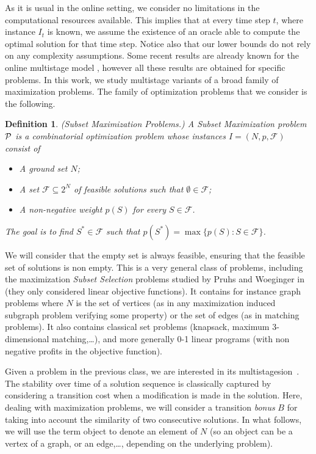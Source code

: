 \documentclass[a4paper]{book}
\newtheorem{definition}{Definition}
\newcommand{\ot}[4]{multistage}
\begin{document}
As it is usual in the online setting, we consider no limitations in the computational resources available. This implies that at every time step $t$, where instance $I_t$ is known, we assume the existence of an oracle able to compute the optimal solution for that time step.  Notice also that our lower bounds do not rely on any complexity assumptions. 
Some recent results are already known for the online multistage model  \cite{Bampis+,Gupta}, however all these results are obtained for specific problems.
In this work, we study multistage variants  of a broad family of maximization problems. The family of optimization problems that we consider is the following. 


 
 

\begin{definition}

\emph{(Subset Maximization Problems.)} A Subset Maximization problem $\cal P$ is a combinatorial optimization problem whose instances $I=(N,p,\mathcal{F})$ consist of
\begin{itemize}
    \item A ground set $N$;
    \item A set $\mathcal{F}\subseteq 2^N$ of feasible solutions such that $\emptyset\in\mathcal{F}$;
    \item A non-negative weight $p(S)$ for every $S \in \mathcal{F}$.
\end{itemize}
The goal is to find $S^*\in \mathcal{F}$ such that $p(S^*)=\max\{p(S):S\in\mathcal{F}\}$.
\end{definition}
We will consider that the empty set is always feasible, ensuring that the feasible set of solutions is non empty.
This is a very general class of problems, including the maximization \emph{Subset Selection} problems studied by Pruhs and Woeginger in \cite{Pruhs} (they only considered linear objective functions). It contains for instance graph problems where $N$ is the set of vertices (as in any maximization induced subgraph problem verifying some property) or the set of edges (as in  matching problems). It also contains classical set problems (knapsack, maximum 3-dimensional matching,\dots), and more generally 0-1 linear programs (with non negative profits in the objective function).



Given a problem in the previous class, we are interested in its \ot{} version~\cite{Gupta,Eisenstat}.
The stability over time of a solution sequence is classically captured by considering a transition cost when a modification is made in the solution. Here, dealing with maximization problems, we will consider a transition {\it bonus} $B$ for taking into account the similarity of two consecutive solutions.
In what follows, we will use the term object to denote an element of $N$ (so an object can be a vertex of a graph, or an edge,\dots, depending on the underlying problem). 	%
\end{document}
